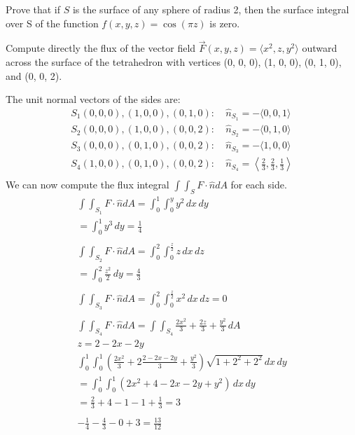 \documentclass[12pt]{exam}
\begin{document}
\begin{questions}
\question Prove that if $S$ is the surface of any sphere of radius 2, then the surface integral over S of the function $f (x, y, z) = \cos(\pi z)$ is zero.
\clearpage

\question Compute directly the flux of the vector field $\overrightarrow{F}(x, y, z) = \langle x^2, z, y^2 \rangle$ outward across the surface of the tetrahedron with vertices (0, 0, 0), (1, 0, 0), (0, 1, 0), and (0, 0, 2).
    \begin{solution}
        The unit normal vectors of the sides are:
        \begin{align*}
            S_1 (0, 0, 0), (1, 0, 0), (0, 1, 0):&\ \hat{n}_{S_1} = -\langle 0, 0, 1 \rangle \\
            S_2 (0, 0, 0), (1, 0, 0), (0, 0, 2):&\ \hat{n}_{S_2} = -\langle 0, 1, 0 \rangle \\
            S_3 (0, 0, 0), (0, 1, 0), (0, 0, 2):&\ \hat{n}_{S_3} = -\langle 1, 0, 0 \rangle \\
            S_4 (1, 0, 0), (0, 1, 0), (0, 0, 2):&\ \hat{n}_{S_4} = \left\langle \frac{2}{3}, \frac{2}{3}, \frac{1}{3} \right\rangle \\
        \end{align*}
        We can now compute the flux integral $\int \int_S F \cdot \hat{n} dA$ for each side.
        \begin{gather*}
            \int \int_{S_1} F \cdot \hat{n} dA = \int_{0}^{1}\int_{0}^{y} y^2 \,dx\,dy \\
            =  \int_{0}^{1} y^3 \,dy = \frac{1}{4} \\\\
            \int \int_{S_2} F \cdot \hat{n} dA = \int_{0}^{2}\int_{0}^{\frac{z}{2}} z \,dx\,dz \\
            =  \int_{0}^{2} \frac{z^2}{2} \,dy = \frac{4}{3} \\\\
            \int \int_{S_3} F \cdot \hat{n} dA = \int_{0}^{2}\int_{0}^{\frac{z}{2}} x^2 \,dx\,dz = 0 \\\\
            \int \int_{S_4} F \cdot \hat{n} dA = \int\int_{S_4} \frac{2x^2}{3} + \frac{2z}{3} + \frac{y^2}{3} \,dA \\
            z = 2 - 2x - 2y\\
            \int_{0}^{1}\int_{0}^{1} \left(\frac{2x^2}{3} + 2\frac{2 - 2x - 2y}{3} + \frac{y^2}{3}\right)\sqrt{1+2^2+2^2} \,dx\,dy \\
            = \int_{0}^{1}\int_{0}^{1} \left(2x^2 + 4 - 2x - 2y + y^2\right) \,dx\,dy \\
            = \frac{2}{3} + 4 - 1 - 1 + \frac{1}{3} = 3\\\\
            -\frac{1}{4} - \frac{4}{3} - 0 + 3 = \boxed{\frac{13}{12}}
        \end{gather*}
    \end{solution}
    \clearpage


\end{questions}
\end{document}
